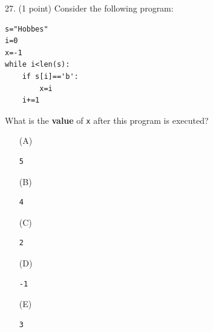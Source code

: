 \documentclass{article}
\begin{document}
\noindent
\begin{minipage}{\textwidth}
27. (1 point)
Consider the following program:
\begin{verbatim}
s="Hobbes"
i=0
x=-1
while i<len(s):
    if s[i]=='b':
        x=i
    i+=1
\end{verbatim}
What is the \textbf{value} of \texttt{x} after this program is executed?

\begin{enumerate}
\item[(A)]
\begin{verbatim}5\end{verbatim}

\item[(B)]
\begin{verbatim}4\end{verbatim}

\item[(C)]
\begin{verbatim}2\end{verbatim}

\item[(D)]
\begin{verbatim}-1\end{verbatim}

\item[(E)]
\begin{verbatim}3\end{verbatim}

\end{enumerate}
\end{minipage}
\vspace{2em}
\filbreak\vfil{}\vfilneg
\end{document}

